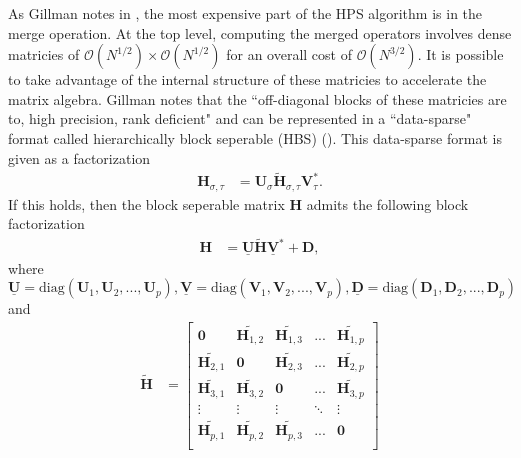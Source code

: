 As Gillman notes in \cite{gillman2014direct}, the most expensive part of the HPS algorithm is in the merge operation. At the top level, computing the merged operators involves dense matricies of $\mathcal{O}(N^{1/2}) \times \mathcal{O}(N^{1/2})$ for an overall cost of $\mathcal{O}(N^{3/2})$. It is possible to take advantage of the internal structure of these matricies to accelerate the matrix algebra. Gillman notes that the ``off-diagonal blocks of these matricies are to, high precision, rank deficient" and can be represented in a ``data-sparse" format called hierarchically block seperable (HBS) (\cite{gillman2014direct}). This data-sparse format is given as a factorization
\begin{align}
    \textbf{H}_{\sigma, \tau} &= \textbf{U}_{\sigma} \tilde{\textbf{H}}_{\sigma, \tau} \textbf{V}_{\tau}^*.
\end{align}
If this holds, then the block seperable matrix $\textbf{H}$ admits the following block factorization
\begin{align}
    \textbf{H} &= \underline{\textbf{U}} \tilde{\textbf{H}} \underline{\textbf{V}}^* + \textbf{D},
\end{align}
where $\underline{\textbf{U}} = \text{diag}(\textbf{U}_1, \textbf{U}_2, ..., \textbf{U}_p), \underline{\textbf{V}} = \text{diag}(\textbf{V}_1, \textbf{V}_2, ..., \textbf{V}_p), \underline{\textbf{D}} = \text{diag}(\textbf{D}_1, \textbf{D}_2, ..., \textbf{D}_p)$
and
\begin{align}
    \tilde{\textbf{H}} &=
    \begin{bmatrix}
        \textbf{0}       & \tilde{\textbf{H}_{1,2}} & \tilde{\textbf{H}_{1,3}} & ...    & \tilde{\textbf{H}_{1,p}} \\
        \tilde{\textbf{H}_{2,1}} & \textbf{0}       & \tilde{\textbf{H}_{2,3}} & ...    & \tilde{\textbf{H}_{2,p}} \\
        \tilde{\textbf{H}_{3,1}} & \tilde{\textbf{H}_{3,2}} & \textbf{0}       & ...    & \tilde{\textbf{H}_{3,p}} \\
        \vdots           & \vdots           & \vdots           & \ddots & \vdots           \\
        \tilde{\textbf{H}_{p,1}} & \tilde{\textbf{H}_{p,2}} & \tilde{\textbf{H}_{p,3}} & ...    & \textbf{0}       \\
    \end{bmatrix}
\end{align}

